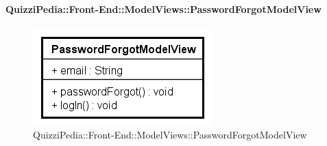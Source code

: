 \paragraph{QuizziPedia::Front-End::ModelViews::PasswordForgotModelView}
	
	\label{QuizziPedia::Front-End::ModelViews::PasswordForgotModelView}
	
	\begin{figure}[ht]
		\centering
		\includegraphics[scale=0.8,keepaspectratio]{UML/Classi/Front-End/QuizziPedia_Front-end_ModelView_PasswordForgotModelView.png}
		\caption{QuizziPedia::Front-End::ModelViews::PasswordForgotModelView}
	\end{figure} \FloatBarrier
	
